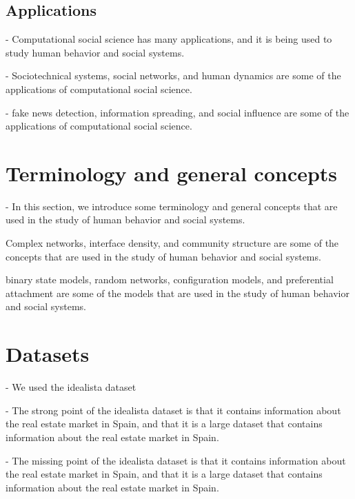 \subsection{\label{subsec:Applications} Applications}

- Computational social science has many applications, and it is being used to study human behavior and social systems.

- Sociotechnical systems, social networks, and human dynamics are some of the applications of computational social science.

- fake news detection, information spreading, and social influence are some of the applications of computational social science.

\section{\label{sec:Terminology and general concepts} Terminology and general concepts}

- In this section, we introduce some terminology and general concepts that are used in the study of human behavior and social systems.

Complex networks, interface density, and community structure are some of the concepts that are used in the study of human behavior and social systems.

binary state models, random networks, configuration models, and preferential attachment are some of the models that are used in the study of human behavior and social systems.

\section{\label{sec:Datasets} Datasets}

- We used the idealista dataset

- The strong point of the idealista dataset is that it contains information about the real estate market in Spain, and that it is a large dataset that contains information about the real estate market in Spain.

- The missing point of the idealista dataset is that it contains information about the real estate market in Spain, and that it is a large dataset that contains information about the real estate market in Spain.
